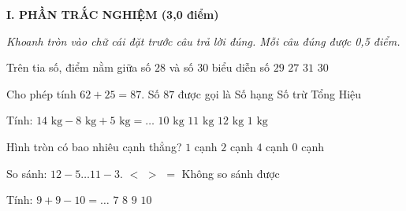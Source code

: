 
\setcounter{ex}{0}
\setcounter{bt}{0}

\textbf{\large I. PHẦN TRẮC NGHIỆM (3,0 điểm)}

{\itshape Khoanh tròn vào chữ cái đặt trước câu trả lời đúng. Mỗi câu đúng được 0,5 điểm.}

\begin{ex} %
Trên tia số, điểm nằm giữa số $28$ và số $30$ biểu diễn số
\choice
{\True $29$}
{$27$}
{$31$}
{$30$}
\end{ex}

\begin{ex} %
Cho phép tính $62 + 25 = 87$. Số $87$ được gọi là
\choice
{Số hạng}
{Số trừ}
{\True Tổng}
{Hiệu}
\end{ex}

\begin{ex} %
Tính: $14\text{ kg} - 8\text{ kg} + 5\text{ kg} = \dots$
\choice
{$10\text{ kg}$}
{\True $11\text{ kg}$}
{$12\text{ kg}$}
{$1\text{ kg}$}
\end{ex}

\begin{ex} %
Hình tròn có bao nhiêu cạnh thẳng?
\choice
{$1$ cạnh}
{$2$ cạnh}
{$4$ cạnh}
{\True $0$ cạnh}
\end{ex}

\begin{ex} %
So sánh: $12 - 5 \dots 11 - 3$.
\choice
{\True $<$}
{$>$}
{$=$}
{Không so sánh được}
\end{ex}

\begin{ex} %
Tính: $9 + 9 - 10 = \dots$
\choice
{$7$}
{\True $8$}
{$9$}
{$10$}
\end{ex}

